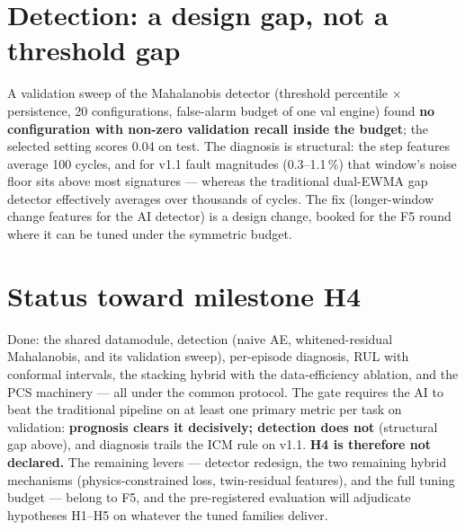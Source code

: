 \section{Detection: a design gap, not a threshold gap}
\label{sec:det-sweep}

A validation sweep of the Mahalanobis detector (threshold percentile $\times$ persistence,
20 configurations, false-alarm budget of one val engine) found \textbf{no configuration
with non-zero validation recall inside the budget}; the selected setting scores 0.04 on
test. The diagnosis is structural: the step features average 100 cycles, and for v1.1 fault
magnitudes (0.3--1.1\,\%) that window's noise floor sits above most signatures ---
whereas the traditional dual-EWMA gap detector effectively averages over thousands of
cycles. The fix (longer-window change features for the AI detector) is a design change,
booked for the F5 round where it can be tuned under the symmetric budget.

\section{Status toward milestone H4}

Done: the shared datamodule, detection (naive AE, whitened-residual Mahalanobis, and its
validation sweep), per-episode diagnosis, RUL with conformal intervals, the stacking hybrid
with the data-efficiency ablation, and the PCS machinery --- all under the common protocol.
The gate requires the AI to beat the traditional pipeline on at least one primary metric per
task on validation: \textbf{prognosis clears it decisively; detection does not} (structural
gap above), and diagnosis trails the ICM rule on v1.1. \textbf{H4 is therefore not declared.}
The remaining levers --- detector redesign, the two remaining hybrid mechanisms
(physics-constrained loss, twin-residual features), and the full tuning budget --- belong to
F5, and the pre-registered evaluation will adjudicate hypotheses H1--H5 on whatever the
tuned families deliver.
